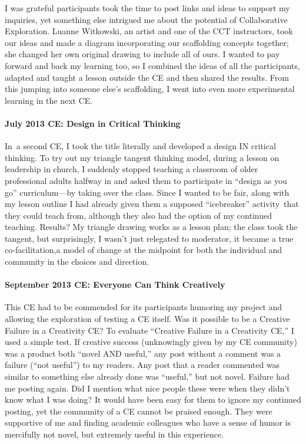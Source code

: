 I was grateful participants took the time to post links and ideas to
support my inquiries, yet something else intrigued me about the
potential of Collaborative Exploration. Luanne Witkowski, an artist and
one of the CCT instructors, took our ideas and made a diagram
incorporating our scaffolding concepts together; she changed her own
original drawing to include all of ours. I wanted to pay forward and
back my learning too, so I combined the ideas of all the participants,
adapted and taught a lesson outside the CE and then shared the results.
From this jumping into someone else's scaffolding, I went into even more
experimental learning in the next CE.

\paragraph{July 2013 CE: Design in Critical
Thinking}\label{july-2013-ce-design-in-critical-thinking}

In~a second CE, I took the title literally and developed a design IN
critical thinking. To try out my triangle tangent thinking model, during
a lesson on leadership in church, I suddenly stopped teaching a
classroom of older professional adults halfway in and asked them to
participate in ``design as you go'' curriculum---by taking over the
class. Since I wanted to be fair, along with my lesson outline I had
already given them a supposed ``icebreaker'' activity~that they could
teach from, although they also had the option of my continued teaching.
Results? My triangle drawing works as a lesson plan; the class took the
tangent, but surprisingly, I wasn't just relegated to moderator, it
became a true co-facilitation,a model of change at the midpoint for both
the individual and community in the choices and direction.

\paragraph{September 2013 CE: Everyone Can Think
Creatively}\label{september-2013-ce-everyone-can-think-creatively}

This CE had to be commended for its participants humoring my project and
allowing the exploration of testing a CE itself. Was it possible to be a
Creative Failure in a Creativity CE? To evaluate ``Creative Failure in a
Creativity CE,'' I used a simple test. If creative success (unknowingly
given by my CE community) was a product both ``novel AND useful,'' any
post without a comment was a failure (``not useful'') to my readers. Any
post that a reader commented was similar to something else already done
was ``useful,'' but not novel. Failure had me posting again. Did I
mention what nice people these were when they didn't know what I was
doing? It would have been easy for them to ignore my continued posting,
yet the community of a CE cannot be praised enough. They were supportive
of me and finding academic colleagues who have a sense of humor is
mercifully not novel, but extremely useful in this experience.


